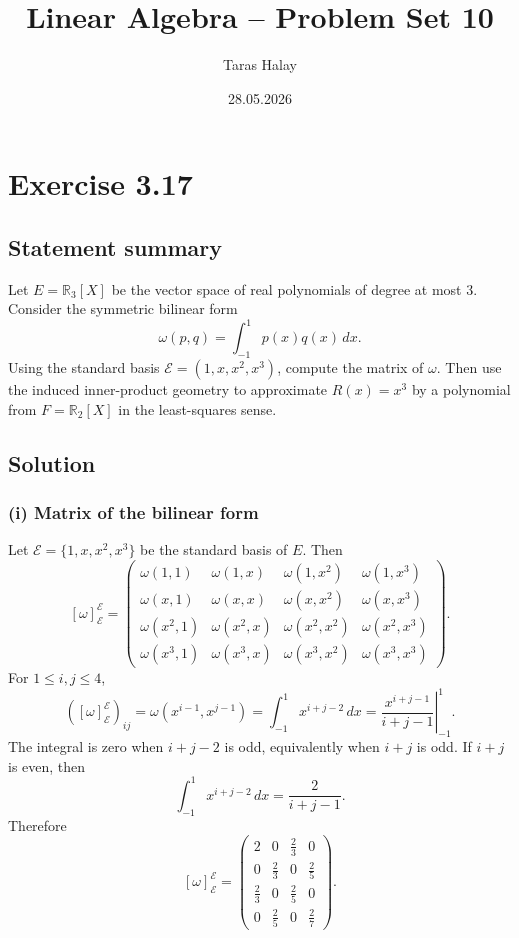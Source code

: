 \documentclass[11pt,a4paper]{article}
\title{Linear Algebra -- Problem Set 10}
\author{Taras Halay}
\date{28.05.2026}
\newcommand{\R}{\mathbb{R}}
\begin{document}
\maketitle

\section*{Exercise 3.17}

\subsection*{Statement summary}
Let $E=\R_3[X]$ be the vector space of real polynomials of degree at most $3$. Consider the symmetric bilinear form
\[
    \omega(p,q)=\int_{-1}^{1}p(x)q(x)\,dx.
\]
Using the standard basis $\mathcal E=(1,x,x^2,x^3)$, compute the matrix of $\omega$. Then use the induced inner-product geometry to approximate $R(x)=x^3$ by a polynomial from $F=\R_2[X]$ in the least-squares sense.

\subsection*{Solution}
\subsubsection*{(i) Matrix of the bilinear form}
Let $\mathcal E=\{1,x,x^2,x^3\}$ be the standard basis of $E$. Then
\[
[\omega]^{\mathcal E}_{\mathcal E}=\begin{pmatrix}
\omega(1,1)&\omega(1,x)&\omega(1,x^2)&\omega(1,x^3)\\
\omega(x,1)&\omega(x,x)&\omega(x,x^2)&\omega(x,x^3)\\
\omega(x^2,1)&\omega(x^2,x)&\omega(x^2,x^2)&\omega(x^2,x^3)\\
\omega(x^3,1)&\omega(x^3,x)&\omega(x^3,x^2)&\omega(x^3,x^3)
\end{pmatrix}.
\]
For $1\le i,j\le 4$,
\[
([\omega]^{\mathcal E}_{\mathcal E})_{ij}
=\omega(x^{i-1},x^{j-1})
=\int_{-1}^{1}x^{i+j-2}\,dx
=\left.\frac{x^{i+j-1}}{i+j-1}\right|_{-1}^{1}.
\]
The integral is zero when $i+j-2$ is odd, equivalently when $i+j$ is odd. If $i+j$ is even, then
\[
\int_{-1}^{1}x^{i+j-2}\,dx=\frac{2}{i+j-1}.
\]
Therefore
\[
[\omega]^{\mathcal E}_{\mathcal E}=\begin{pmatrix}
2&0&\frac23&0\\
0&\frac23&0&\frac25\\
\frac23&0&\frac25&0\\
0&\frac25&0&\frac27
\end{pmatrix}.
\]
\end{document}
